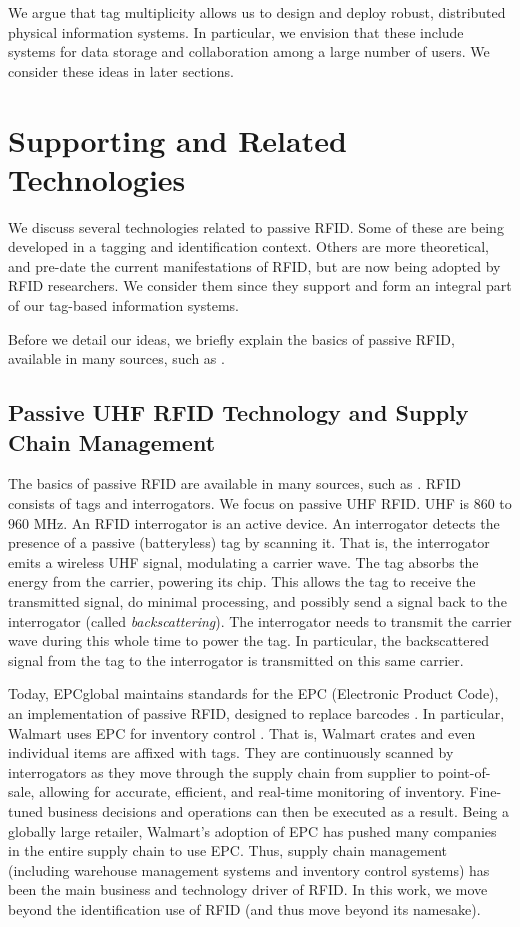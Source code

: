 We argue that tag multiplicity allows us to design and deploy robust, distributed physical information systems. In particular, we envision that these include systems for data storage and collaboration among a large number of users. We consider these ideas in later sections.

\section{Supporting and Related Technologies}
We discuss several technologies related to passive RFID. Some of these are being developed in a tagging and identification context. Others are more theoretical, and pre-date the current manifestations of RFID, but are now being adopted by RFID researchers. We consider them since they support and form an integral part of our tag-based information systems. 

Before we detail our ideas, we briefly explain the basics of passive RFID, available in many sources, such as \cite{2008 Dobkin}.

\subsection{Passive UHF RFID Technology and Supply Chain Management}
The basics of passive RFID are available in many sources, such as \cite{2008 Dobkin}. RFID consists of tags and interrogators. We focus on passive UHF RFID. UHF is $860$ to $960$ MHz. An RFID interrogator is an active device. An interrogator detects the presence of a passive (batteryless) tag by scanning it. That is, the interrogator emits a wireless UHF signal, modulating a carrier wave. The tag absorbs the energy from the carrier, powering its chip. This allows the tag to receive the transmitted signal, do minimal processing, and possibly send a signal back to the interrogator (called \emph{backscattering}). The interrogator needs to transmit the carrier wave during this whole time to power the tag. In particular, the backscattered signal from the tag to the interrogator is transmitted on this same carrier.

Today, EPCglobal maintains standards for the EPC (Electronic Product Code), an implementation of passive RFID, designed to replace barcodes \cite{EPCglobal}. In particular, Walmart uses EPC for inventory control \cite{Walmart}. That is, Walmart crates and even individual items are affixed with tags. They are continuously scanned by interrogators as they move through the supply chain from supplier to point-of-sale, allowing for accurate, efficient, and real-time monitoring of inventory. Fine-tuned business decisions and operations can then be executed as a result. Being a globally large retailer, Walmart's adoption of EPC has pushed many companies in the entire supply chain to use EPC. Thus, supply chain management (including warehouse management systems and inventory control systems) has been the main business and technology driver of RFID. In this work, we move beyond the identification use of RFID (and thus move beyond its namesake).


